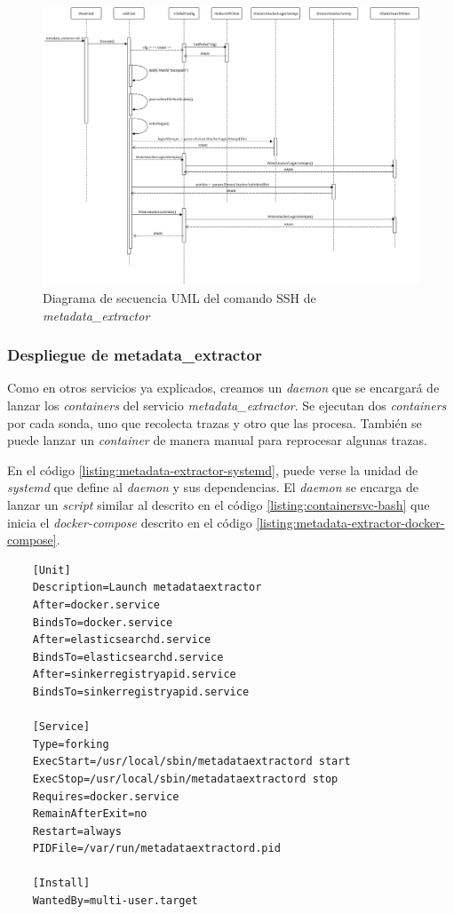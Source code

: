 \begin{figure}
    \centering
    \includegraphics[scale=0.4]{images/UMLSequenceSSHOp}
    \caption{Diagrama de secuencia UML del comando SSH de \emph{metadata\_extractor}}
    \label{fig:uml-sequence-ssh-metadata-extractor}
\end{figure}

\subsubsection{Despliegue de metadata\_extractor}

Como en otros servicios ya explicados, creamos un \emph{daemon} que se encargará de lanzar los \emph{containers} del servicio \emph{metadata\_extractor}. Se ejecutan dos \emph{containers}
por cada sonda, uno que recolecta trazas y otro que las procesa. También se puede lanzar un \emph{container} de manera manual para reprocesar algunas trazas.

En el código \ref{listing:metadata-extractor-systemd}, puede verse la unidad de \emph{systemd} que define al \emph{daemon} y sus dependencias.
El \emph{daemon} se encarga de lanzar un \emph{script} similar al descrito en el código \ref{listing:containersvc-bash} que inicia el \emph{docker-compose}
descrito en el código \ref{listing:metadata-extractor-docker-compose}.


\begin{verbatim}
    [Unit]
    Description=Launch metadataextractor
    After=docker.service
    BindsTo=docker.service
    After=elasticsearchd.service
    BindsTo=elasticsearchd.service
    After=sinkerregistryapid.service
    BindsTo=sinkerregistryapid.service
    
    [Service]
    Type=forking
    ExecStart=/usr/local/sbin/metadataextractord start
    ExecStop=/usr/local/sbin/metadataextractord stop
    Requires=docker.service
    RemainAfterExit=no
    Restart=always
    PIDFile=/var/run/metadataextractord.pid
    
    [Install]
    WantedBy=multi-user.target    
         
\end{verbatim}
\bigskip


